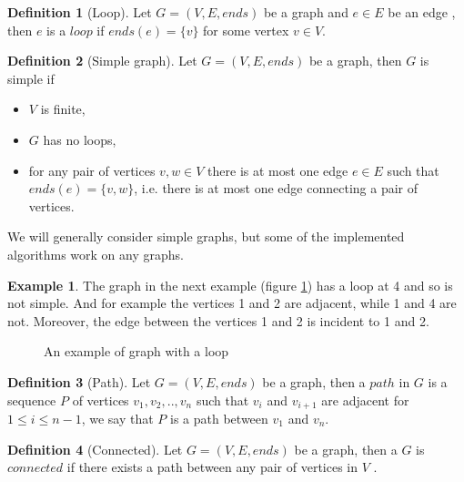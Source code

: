 \documentclass{report}
\theoremstyle{plain}
\theoremstyle{definition}
\newtheorem{definition}{Definition}
\newtheorem{example}{Example}
\theoremstyle{remark}
\numberwithin{definition}{chapter}
\numberwithin{example}{chapter}
\numberwithin{figure}{chapter}
\begin{document}
\begin{definition}[Loop]
Let $G = (V, E, ends)$ be a graph and $e \in E$ be an edge , then $e$ is a $loop$ if $ends(e) = \{v\}$ for some vertex $v \in V$.
\end{definition}

\begin{definition}[Simple graph]
Let $G = (V, E, ends)$ be a graph, then $G$ is simple if
\begin{itemize}
\item $V$ is finite,
\item $G$ has no loops,
\item for any pair of vertices $v,w \in V$ there is at most one edge $e \in E$ such that $ends(e) = \{v, w\}$, i.e. there is at most one edge connecting a pair of vertices.
\end{itemize}
\end{definition}

We will generally consider simple graphs, but some of the implemented algorithms work on any graphs.

\begin{example}
The graph in the next example (figure \ref{loop}) has a loop at 4 and so is not simple. And for example the vertices 1 and 2 are adjacent, while 1 and 4 are not. Moreover, the edge between the vertices 1 and 2 is incident to 1 and 2.
\begin{figure}[h]
\center
{}
\caption{An example of graph with a loop}
\label{loop}
\end{figure}
\end{example}

\begin{definition}[Path]
Let $G = (V, E, ends)$ be a graph, then a $path$ in $G$ is a sequence $P$ of vertices $v_1,v_2,..,v_n$ such that $v_i$ and $v_{i+1}$ are adjacent for $1 \leq i \leq n - 1$, we say that $P$ is a path between $v_1$ and $v_n$.
\end{definition}

\begin{definition}[Connected]
Let $G = (V, E, ends)$ be a graph, then a $G$ is $connected$ if there exists a path between any pair of vertices in $V$ \cite{bollobas1998modern}.
\end{definition}
\end{document}
